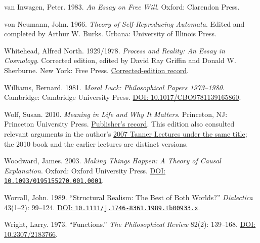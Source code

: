 \documentclass[
  english,
  11pt,
  oneside]{book}
\begin{document}
van Inwagen, Peter. 1983. \emph{An Essay on Free Will}. Oxford: Clarendon Press.

von Neumann, John. 1966. \emph{Theory of Self-Reproducing Automata}. Edited and completed by Arthur W. Burks. Urbana: University of Illinois Press.

Whitehead, Alfred North. 1929/1978. \emph{Process and Reality: An Essay in Cosmology}. Corrected edition, edited by David Ray Griffin and Donald W. Sherburne. New York: Free Press. \href{https://whiteheadresearch.org/research/contemporary-whitehead-studies/proposals/suggested-editions/}{Corrected-edition record}.

Williams, Bernard. 1981. \emph{Moral Luck: Philosophical Papers 1973--1980}. Cambridge: Cambridge University Press. \href{https://doi.org/10.1017/CBO9781139165860}{DOI: 10.1017/CBO9781139165860}.

Wolf, Susan. 2010. \emph{Meaning in Life and Why It Matters}. Princeton, NJ: Princeton University Press. \href{https://press.princeton.edu/books/paperback/9780691154503/meaning-in-life-and-why-it-matters}{Publisher's record}. This edition also consulted relevant arguments in the author's \href{https://tannerlectures.org/documents/meaning-in-life-and-why-it-matters/}{2007 Tanner Lectures under the same title}; the 2010 book and the earlier lectures are distinct versions.

Woodward, James. 2003. \emph{Making Things Happen: A Theory of Causal Explanation}. Oxford: Oxford University Press. \href{https://doi.org/10.1093/0195155270.001.0001}{DOI: \nolinkurl{10.1093/0195155270.001.0001}}.

Worrall, John. 1989. ``Structural Realism: The Best of Both Worlds?'' \emph{Dialectica} 43(1--2): 99--124. \href{https://doi.org/10.1111/j.1746-8361.1989.tb00933.x}{DOI: \nolinkurl{10.1111/j.1746-8361.1989.tb00933.x}}.

Wright, Larry. 1973. ``Functions.'' \emph{The Philosophical Review} 82(2): 139--168. \href{https://doi.org/10.2307/2183766}{DOI: 10.2307/2183766}.

\par\endgroup

\backmatter
\end{document}
